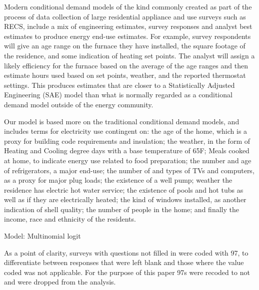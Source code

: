 \documentclass{article}
\begin{document}
  
  
Modern conditional demand models of the kind commonly created as part of the process of data collection of large residential appliance and use surveys such as RECS, include a mix of engineering estimates, survey responses and analyst best estimates to produce energy end-use estimates.  For example, survey respondents will give an age range on the furnace they have installed, the square footage of the residence, and some indication of heating set points.  The analyst will assign a likely efficiency for the furnace based on the average of the age ranges and then estimate hours used based on set points, weather, and the reported thermostat settings.  This produces estimates that are closer to a Statistically Adjusted Engineering (SAE) model than what is normally regarded as a conditional demand model outside of the energy community.

Our model is based more on the traditional conditional demand models, and includes terms for electricity use contingent on: the age of the home, which is a proxy for building code requirements and insulation; the weather, in the form of Heating and Cooling degree days with a base temperature of 65F; Meals cooked at home, to indicate energy use related to food preparation; the number and age of refrigerators, a major end-use;  the number of and types of TVs and computers, as a proxy for major plug loads; the existence of a well pump; weather the residence has electric hot water service; the existence of pools and hot tubs as well as if they are electrically heated; the kind of windows installed, as another indication of shell quality; the number of people in the home; and finally the income, race and ethnicity of the residents.  


Model: Multinomial logit

As a point of clarity, surveys with questions not filled in were coded with 97, to differentiate between responses that were left blank and those where the value coded was not applicable.  For the purpose of this paper 97s were recoded to not and were dropped from the analysis.  

\end{document}
